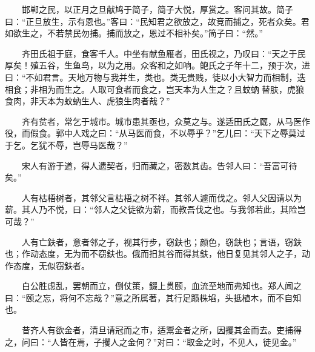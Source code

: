 　　邯郸之民，以正月之旦献鸠于简子，简子大悦，厚赏之。客问其故。简子曰：``正旦放生，示有恩也。''客曰：``民知君之欲放之，故竞而捕之，死者众矣。君如欲生之，不若禁民勿捕。捕而放之，恩过不相补矣。''简子曰：``然。''

　　齐田氏祖于庭，食客千人。中坐有献鱼雁者，田氏视之，乃叹曰：``天之于民厚矣！殖五谷，生鱼鸟，以为之用。众客和之如响。鲍氏之子年十二，预于次，进曰：``不如君言。天地万物与我并生，类也。类无贵贱，徒以小大智力而相制，迭相食；非相为而生之。人取可食者而食之，岂天本为人生之？且蚊蚋替肤，虎狼食肉，非天本为蚊蚋生人、虎狼生肉者哉？''

　　齐有贫者，常乞于城市。城市患其亟也，众莫之与。遂适田氏之厩，从马医作役，而假食。郭中人戏之曰：``从马医而食，不以辱乎？''乞儿曰：``天下之辱莫过于乞。乞犹不辱，岂辱马医哉？''

　　宋人有游于道，得人遗契者，归而藏之，密数其齿。告邻人曰：``吾富可待矣。''

　　人有枯梧树者，其邻父言枯梧之树不祥。其邻人遽而伐之。邻人父因请以为薪。其人乃不悦，曰：``邻人之父徒欲为薪，而教吾伐之也。与我邻若此，其险岂可哉？''

　　人有亡鈇者，意者邻之子，视其行步，窃鈇也；颜色，窃鈇也；言语，窃鈇也；作动态度，无为而不窃鈇也。俄而抇其谷而得其鈇，他日复见其邻人之子，动作态度，无似窃鈇者。

　　白公胜虑乱，罢朝而立，倒仗策，錣上贯颐，血流至地而弗知也。郑人闻之曰：``颐之忘，将何不忘哉？''意之所属著，其行足踬株埳，头抵植木，而不自知也。

　　昔齐人有欲金者，清旦请冠而之市，适鬻金者之所，因攫其金而去。吏捕得之，问曰：``人皆在焉，子攫人之金何？''对曰：``取金之时，不见人，徒见金。''
